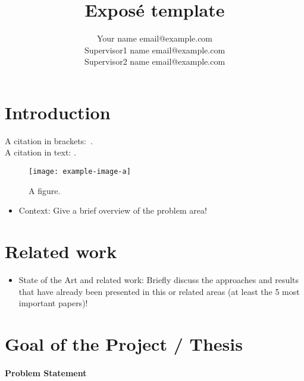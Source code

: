 \documentclass[akbc,twoside,11pt,lettersize]{article}
\begin{document}
\title{Exposé template}

\author{\name Your name \email email@example.com \\
\AND
\name Supervisor1 name \email email@example.com \\
\AND
\name Supervisor2 name  \email email@example.com}

\maketitle


\section{Introduction}
\label{Introduction}

    A citation in brackets:~\cite{lecun2015deep}. \\
    A citation in text: \citet{lecun2015deep}.

    \begin{figure}[h]
        \centering
        \texttt{[image: example-image-a]}
    \caption{A figure.}
    \label{figure1}
    \end{figure}

\begin{itemize}
    \item Context: Give a brief overview of the problem area!
\end{itemize}    

\section{Related work}
\label{related_work}

\begin{itemize}
    \item State of the Art and related work: Briefly discuss the approaches and results that have already been presented in this or related areas (at least the 5 most important papers)!
\end{itemize}  

\section{Goal of the Project / Thesis}

\paragraph{Problem Statement}
\end{document}
